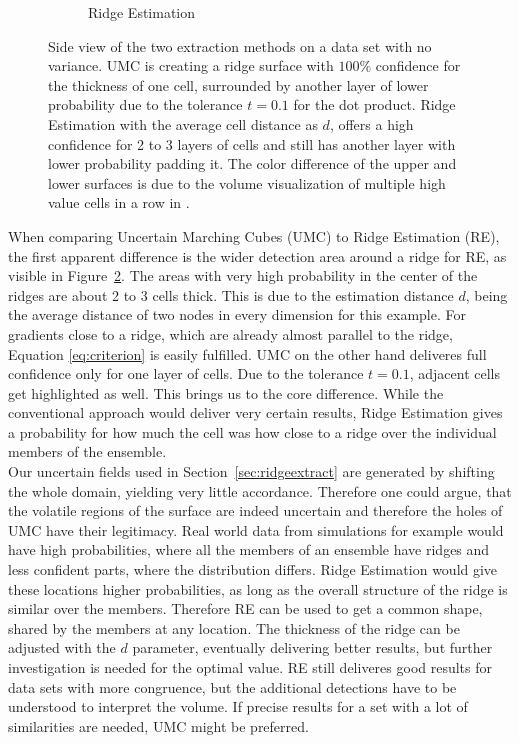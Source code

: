 \begin{figure}
\begin{subfigure}{0.49\textwidth}
        \caption{Ridge Estimation}
        \label{fig:REside}
    \end{subfigure}
    \caption{Side view of the two extraction methods on a data set with
    no variance.  UMC is creating a ridge surface
    with $100\%$ confidence for the thickness of one cell, surrounded by
    another layer of lower probability due to the tolerance $t=0.1$ for
    the dot product.  Ridge Estimation with the
    average cell distance as $d$, offers a high confidence for 2 to 3
    layers of cells and still has another layer with lower probability
    padding it. The color difference of the upper and lower surfaces is
    due to the volume visualization of multiple high value cells in a
    row in .}
    \label{fig:ridgeSide}
\end{figure}

When comparing Uncertain Marching Cubes (UMC) to Ridge Estimation (RE),
the first apparent difference is the wider detection area around a ridge
for RE, as visible in Figure~\ref{fig:ridgeSide}. The areas with very
high probability in the center of the ridges are about 2 to 3 cells
thick. This is due to the estimation distance $d$, being the average
distance of two nodes in every dimension for this example. For gradients
close to a ridge, which are already almost parallel to the ridge,
Equation \ref{eq:criterion} is easily fulfilled. UMC on the other hand
deliveres full confidence only for one layer of cells. Due to the
tolerance $t=0.1$, adjacent cells get highlighted as well. This brings
us to the core difference. While the conventional approach would deliver
very certain results, Ridge Estimation gives a probability for how much
the cell was how close to a ridge over the individual members of the
ensemble.\\
\indent Our uncertain fields used in Section~\ref{sec:ridgeextract}
are generated by shifting the whole domain, yielding very little
accordance. Therefore one could argue, that the volatile regions of the
surface are indeed uncertain and therefore the holes of UMC have their
legitimacy. Real world data from simulations for example would have high
probabilities, where all the members of an ensemble have ridges and less
confident parts, where the distribution differs. Ridge Estimation would
give these locations higher probabilities, as long as the overall
structure of the ridge is similar over the members. Therefore RE can be
used to get a common shape, shared by the members at any location. The
thickness of the ridge can be adjusted with the $d$ parameter,
eventually delivering better results, but further investigation is
needed for the optimal value. RE still deliveres good results for data
sets with more congruence, but the additional detections have to be
understood to interpret the volume. If precise results for a set with a
lot of similarities are needed, UMC might be preferred.

